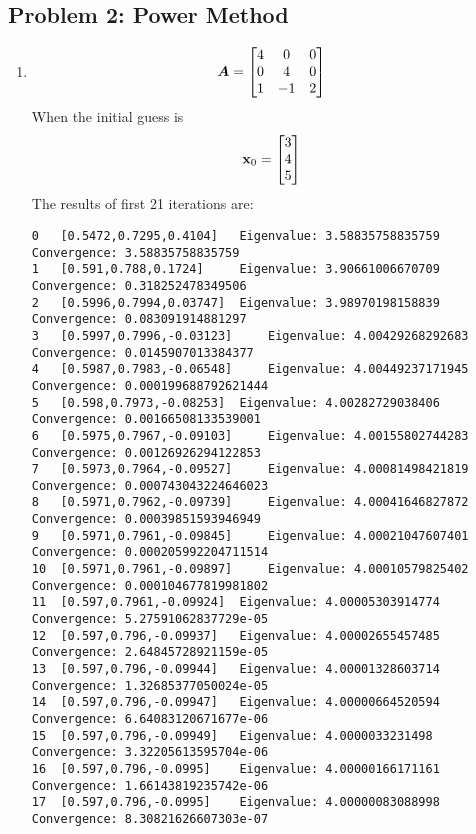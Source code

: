 \documentclass{article}
\begin{document}
\hypertarget{problem_0_homework_checklist_2}{}
\subsection*{{Problem 2: Power Method}}
\label{}

\begin{enumerate}
\item 
\begin{align}
\boldsymbol{A} = \begin{bmatrix} 4 & 0 & 0  \\ 
0 & 4 & 0  \\ 
1 & -1 & 2  \\  \end{bmatrix}
\end{align}
When the initial guess is 
\begin{align}
\boldsymbol{\mathrm{x}}_0=\begin{bmatrix} 3 \\ 4 \\ 5 \end{bmatrix}
\end{align}
The results of first 21 iterations are: 
\begin{verbatim} 
0	[0.5472,0.7295,0.4104]	 Eigenvalue: 3.58835758835759	 Convergence: 3.58835758835759
1	[0.591,0.788,0.1724]	 Eigenvalue: 3.90661006670709	 Convergence: 0.318252478349506
2	[0.5996,0.7994,0.03747]	 Eigenvalue: 3.98970198158839	 Convergence: 0.083091914881297
3	[0.5997,0.7996,-0.03123]	 Eigenvalue: 4.00429268292683	 Convergence: 0.0145907013384377
4	[0.5987,0.7983,-0.06548]	 Eigenvalue: 4.00449237171945	 Convergence: 0.000199688792621444
5	[0.598,0.7973,-0.08253]	 Eigenvalue: 4.00282729038406	 Convergence: 0.00166508133539001
6	[0.5975,0.7967,-0.09103]	 Eigenvalue: 4.00155802744283	 Convergence: 0.00126926294122853
7	[0.5973,0.7964,-0.09527]	 Eigenvalue: 4.00081498421819	 Convergence: 0.000743043224646023
8	[0.5971,0.7962,-0.09739]	 Eigenvalue: 4.00041646827872	 Convergence: 0.00039851593946949
9	[0.5971,0.7961,-0.09845]	 Eigenvalue: 4.00021047607401	 Convergence: 0.000205992204711514
10	[0.5971,0.7961,-0.09897]	 Eigenvalue: 4.00010579825402	 Convergence: 0.000104677819981802
11	[0.597,0.7961,-0.09924]	 Eigenvalue: 4.00005303914774	 Convergence: 5.27591062837729e-05
12	[0.597,0.796,-0.09937]	 Eigenvalue: 4.00002655457485	 Convergence: 2.64845728921159e-05
13	[0.597,0.796,-0.09944]	 Eigenvalue: 4.00001328603714	 Convergence: 1.32685377050024e-05
14	[0.597,0.796,-0.09947]	 Eigenvalue: 4.00000664520594	 Convergence: 6.64083120671677e-06
15	[0.597,0.796,-0.09949]	 Eigenvalue: 4.0000033231498	 Convergence: 3.32205613595704e-06
16	[0.597,0.796,-0.0995]	 Eigenvalue: 4.00000166171161	 Convergence: 1.66143819235742e-06
17	[0.597,0.796,-0.0995]	 Eigenvalue: 4.00000083088998	 Convergence: 8.30821626607303e-07

\end{verbatim}
\end{enumerate}
\end{document}

